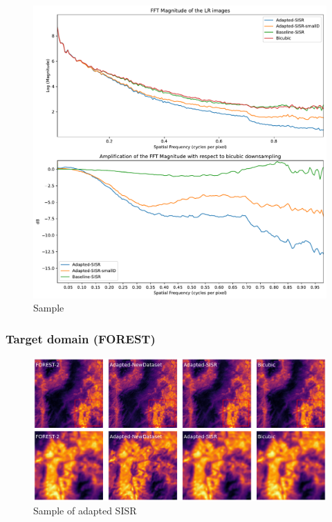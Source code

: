        \begin{figure}[h!]
            \centering
            \includegraphics[scale=0.5]{Includes/6-lr-images-fft-comparison.pdf}
            \caption{Sample }
            \label{fig:6-source_domain_fft_comparison}
        \end{figure}
        
    
        \subsubsection{Target domain (FOREST)}
            \begin{figure}[h!]
                \centering
                \includegraphics[scale=0.3]{Includes/6-target_prediction_sample.pdf}
                \caption{Sample of adapted SISR}
                \label{fig:6-target_prediction_sample}
            \end{figure}


